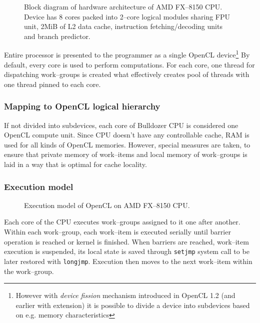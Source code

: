 \begin{figure}[htb]
  \begin{center}
    \scalebox{0.9} {
      
    }
  \end{center}
  \caption{Block diagram of hardware architecture of AMD FX--8150 CPU. Device
    has 8 cores packed into 2--core logical modules sharing FPU unit, 2MiB of
    L2 data cache, instruction fetching/decoding units and branch predictor.}
  \label{fig:bulldozerarch}
\end{figure}

Entire processor is presented to the programmer as a single OpenCL
device\footnote{However with \emph{device fission} mechanism introduced in OpenCL 1.2 (and
earlier with extension) it is possible to divide a device into subdevices based on e.g. memory characteristics}
By default, every core is used to perform computations. For each core, one
thread for dispatching work--groups is created what effectively creates pool
of threads with one thread pinned to each core.

\subsubsection{Mapping to OpenCL logical hierarchy}
If not divided into subdevices, each core of Bulldozer CPU is considered one
OpenCL compute unit. Since CPU doesn't have any controllable cache, RAM is used
for all kinds of OpenCL memories. However, special measures are taken, to ensure
that private memory of work--items and local memory of work--groups is
laid in a way that is optimal for cache locality.
\subsubsection{Execution model}
\begin{figure}[htb]
  \begin{center}
    
  \end{center}
  \caption{Execution model of OpenCL on AMD FX--8150 CPU.}
  \label{fig:clbullexec}
\end{figure}

Each core of the CPU executes work--groups assigned to it one after another.
Within each work--group, each work--item is executed serially until barrier
operation is reached or kernel is finished. When barriers are reached,
work--item execution is suspended, its local state is saved through
\texttt{setjmp} system call to be later restored with \texttt{longjmp}.
Execution then moves to the next work--item within the work--group.

